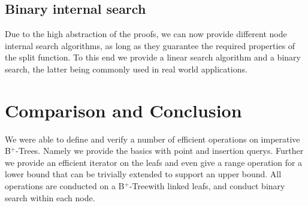 \documentclass[a4paper,UKenglish,cleveref, autoref, thm-restate]{lipics-v2021}
\newcommand{\btree}{B$^+$-Tree}
\newcommand{\btrees}{B$^+$-Trees}
\begin{document}
\subsection{Binary internal search}
\label{sec:imperative_split}

Due to the high abstraction of the proofs,
we can now provide different node internal search algorithms,
as long as they guarantee the required properties of the split function.
To this end we provide a linear search algorithm
and a binary search, the latter being commonly used in real world applications.

\section{Comparison and Conclusion}
\label{sec:conclusion}

We were able to define and verify a number of efficient operations
on imperative \btrees.
Namely we provide the basics with point and insertion querys.
Further we provide an efficient iterator on the leafs
and even give a range operation for a lower bound that
can be trivially extended to support an upper bound.
All operations are conducted on a \btree with linked leafs,
and conduct binary search within each node.
\end{document}
